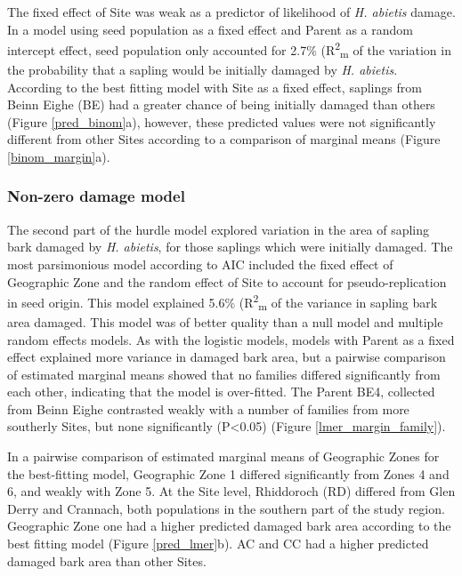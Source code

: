 \documentclass[a4paper, 11pt]{article}
\begin{document}


The fixed effect of Site was weak as a predictor of likelihood of \textit{H. abietis} damage. In a model using seed population as a fixed effect and Parent as a random intercept effect, seed population only accounted for 2.7\% (R\textsuperscript{2}\textsubscript{m} of the variation in the probability that a sapling would be initially damaged by \textit{H. abietis}. According to the best fitting model with Site as a fixed effect, saplings from Beinn Eighe (BE) had a greater chance of being initially damaged than others (Figure \ref{pred_binom}a), however, these predicted values were not significantly different from other Sites according to a comparison of marginal means (Figure \ref{binom_margin}a).

\subsubsection*{Non-zero damage model}

The second part of the hurdle model explored variation in the area of sapling bark damaged by \textit{H. abietis}, for those saplings which were initially damaged. The most parsimonious model according to AIC included the fixed effect of Geographic Zone and the random effect of Site to account for pseudo-replication in seed origin. This model explained 5.6\% (R\textsuperscript{2}\textsubscript{m} of the variance in sapling bark area damaged. This model was of better quality than a null model and multiple random effects models. As with the logistic models, models with Parent as a fixed effect explained more variance in damaged bark area, but a pairwise comparison of estimated marginal means showed that no families differed significantly from each other, indicating that the model is over-fitted. The Parent BE4, collected from Beinn Eighe contrasted weakly with a number of families from more southerly Sites, but none significantly (P\textless{}0.05) (Figure \ref{lmer_margin_family}).

In a pairwise comparison of estimated marginal means of Geographic Zones for the best-fitting model, Geographic Zone 1 differed significantly from Zones 4 and 6, and weakly with Zone 5. At the Site level, Rhiddoroch (RD) differed from Glen Derry and Crannach, both populations in the southern part of the study region. Geographic Zone one had a higher predicted damaged bark area according to the best fitting model (Figure \ref{pred_lmer}b). AC and CC had a higher predicted damaged bark area than other Sites.
\end{document}
